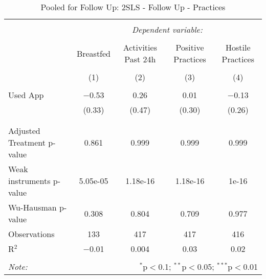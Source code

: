 
\begin{table}[!htbp] \centering 
  \caption{Pooled for Follow Up: 2SLS - Follow Up - Practices} 
  \label{tbl:Pooled for Follow Up: 2SLS - Follow Up - Practices} 
\begin{tabular}{@{\extracolsep{5pt}}lcccc} 
\\[-1.8ex]\hline 
\hline \\[-1.8ex] 
 & \multicolumn{4}{c}{\textit{Dependent variable:}} \\ 
\cline{2-5} 
\\[-1.8ex] & Breastfed & Activities Past 24h & Positive Practices & Hostile Practices \\ 
\\[-1.8ex] & (1) & (2) & (3) & (4)\\ 
\hline \\[-1.8ex] 
 Used App & $-$0.53 & 0.26 & 0.01 & $-$0.13 \\ 
  & (0.33) & (0.47) & (0.30) & (0.26) \\ 
  & & & & \\ 
\hline \\[-1.8ex] 
Adjusted Treatment p-value & 0.861 & 0.999 & 0.999 & 0.999 \\ 
Weak instruments p-value & 5.05e-05 & 1.18e-16 & 1.18e-16 & 1e-16 \\ 
Wu-Hausman p-value & 0.308 & 0.804 & 0.709 & 0.977 \\ 
Observations & 133 & 417 & 417 & 416 \\ 
R$^{2}$ & $-$0.01 & 0.004 & 0.03 & 0.02 \\ 
\hline 
\hline \\[-1.8ex] 
\textit{Note:}  & \multicolumn{4}{r}{$^{*}$p$<$0.1; $^{**}$p$<$0.05; $^{***}$p$<$0.01} \\ 
\end{tabular} 
\end{table} 
